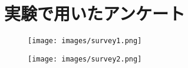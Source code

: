 \appendix
\chapter{実験で用いたアンケート}

\begin{figure}
    \centering
    \texttt{[image: images/survey1.png]}
\end{figure}

\begin{figure}
    \centering
    \texttt{[image: images/survey2.png]}
\end{figure}
